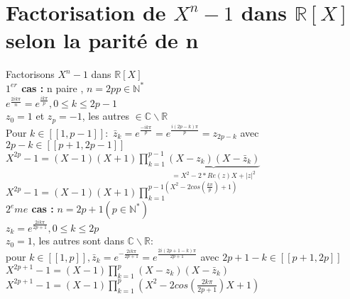 \documentclass{article}
\begin{document}
\section{Factorisation de $X^n-1$ dans $\mathbb R [X]$ selon la parité de n}
Factorisons $X^n-1$ dans $\mathbb R [X]$ \\
{\bf $1^{er}$ cas :} n paire , $n=2p p \in \mathbb N^*$ \\
$e^{\frac{2ik\pi}{n}}=e^{\frac{ik\pi}{p}}, 0 \leq k \leq 2p-1$ \\
$z_0=1$ et $z_p=-1$, les autres $\in \mathbb C \backslash \mathbb R$ \\
Pour $k \in [[1,p-1]]:$ $\bar{z}_k=e^{\frac{-ik\pi}{p}}=e^{\frac{i(2p-k)\pi}{p}}=z_{2p-k}$ avec $2p-k \in [[p+1,2p-1]]$ \\
$X^{2p}-1=(X-1)(X+1)\prod_{k=1}^{p-1}\underbrace{(X-z_k)(X-\bar{z}_k)}_{=X^2-2*Re(z)X+|z|^2}$ \\
$X^{2p}-1=(X-1)(X+1) \prod_{k=1}^{p-1(X^2-2cos(\frac{k\pi}{p})+1)}$ \\
{\bf $2^eme$ cas :} $n=2p+1 (p \in \mathbb N^*)$ \\
$z_k=e^{\frac{2ik\pi}{2p+1}},0 \leq k \leq 2p $ \\
$z_0=1$, les autres sont dans $\mathbb C \backslash \mathbb R$: \\
pour $k \in [[1,p]], \bar{z}_k=e^{-\frac{2ik\pi}{2p+1}}=e^{\frac{2i(2p+1-k)\pi}{2p+1}}$ avec $2p+1-k \in [[p+1,2p]]$ \\
$X^{2p+1}-1=(X-1) \prod_{k=1}^p (X-z_k)(X-\bar{z}_k)$ \\
$X^{2p+1}-1=(X-1) \prod_{k=1}^p (X^2-2cos(\frac{2k\pi}{2p+1})X+1)$
\end{document}

